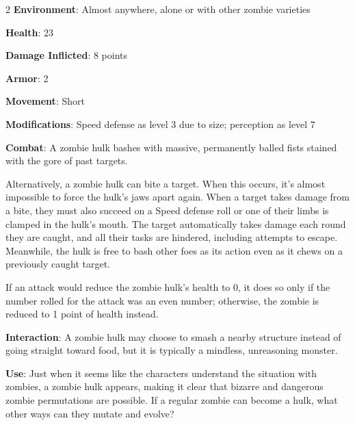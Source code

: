\begin{multicols}{2}
\textbf{Environment}: Almost anywhere, alone or with other zombie varieties 

\textbf{Health}: 23 

\textbf{Damage Inflicted}: 8 points 

\textbf{Armor}: 2 

\textbf{Movement}: Short 

\textbf{Modifications}: Speed defense as level 3 due to size; perception as level 7 

\textbf{Combat}: A zombie hulk bashes with massive, permanently balled fists stained with the gore of past targets. 

Alternatively, a zombie hulk can bite a target. When this occurs, it’s almost impossible to force the hulk’s jaws apart again. When a target takes damage from a bite, they must also succeed on a Speed defense roll or one of their limbs is clamped in the hulk’s mouth. The target automatically takes damage each round they are caught, and all their tasks are hindered, including attempts to escape. Meanwhile, the hulk is free to bash other foes as its action even as it chews on a previously caught target. 

If an attack would reduce the zombie hulk’s health to 0, it does so only if the number rolled for the attack was an even number; otherwise, the zombie is reduced to 1 point of health instead. 

\textbf{Interaction}: A zombie hulk may choose to smash a nearby structure instead of going straight toward food, but it is typically a mindless, unreasoning monster. 

\textbf{Use}: Just when it seems like the characters understand the situation with zombies, a zombie hulk appears, making it clear that bizarre and dangerous zombie permutations are possible. If a regular zombie can become a hulk, what other ways can they mutate and evolve?

\end{multicols}
